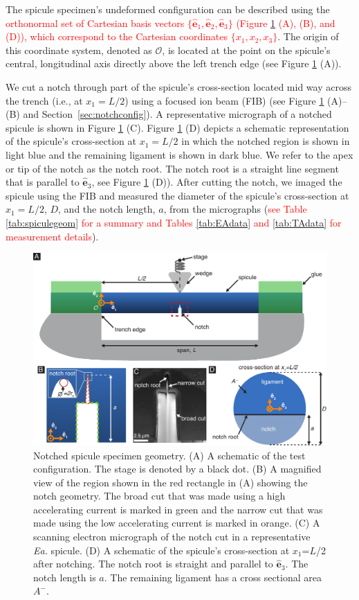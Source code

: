\documentclass[12pt,onecolumn]{article}
\makeatletter
\newcommand{\ex}{{\bm{\hat{e}}}_1}
\newcommand{\ey}{{\bm{\hat{e}}}_2}
\newcommand{\ez}{{\bm{\hat{e}}}_3}
\newcommand{\EA}{\textit{Ea.\@}\xspace}
\makeatother
\begin{document}
\begin{bibunit}
The spicule specimen's undeformed configuration can be described using the \textcolor{red}{orthonormal set of Cartesian basis vectors $\{\ex,\ey,\ez\}$ (Figure \ref{fig:notch} (A), (B), and (D)), which correspond to the Cartesian coordinates $\{x_1,x_2,x_3\}$}. The origin of this coordinate system, denoted as $\mathcal{O}$, is located at the point on the spicule's central, longitudinal axis directly above the left trench edge (see Figure \ref{fig:notch} (A)).

We cut a notch through part of the spicule's cross-section located mid way across the trench (i.e., at $x_1=L/2$) using a focused ion beam (FIB) (see Figure \ref{fig:notch} (A)--(B) and Section~\ref{sec:notchconfig}). A representative micrograph of a notched spicule is shown in Figure \ref{fig:notch} (C). Figure \ref{fig:notch} (D) depicts a schematic representation of the spicule's cross-section at $x_1=L/2$ in which the notched region is shown in light blue and the remaining ligament is shown in dark blue. We refer to the apex or tip of the notch as the notch root. The notch root is a straight line segment that is parallel to $\ez$, see Figure \ref{fig:notch} (D)). After cutting the notch, we imaged the spicule using the FIB and measured the diameter of the spicule's cross-section at $x_1=L/2$, $D$, and the notch length, $a$, from the micrographs (\textcolor{red}{see Table \ref{tab:spiculegeom} for a summary and Tables \ref{tab:EAdata} and \ref{tab:TAdata} for measurement details}). 
%
			\begin{figure}[hb!]
			\centering
			\includegraphics[width=\textwidth]{../Figures/FigureNotch/Figure3_V6.pdf}
			\caption{Notched spicule specimen geometry. (A) A schematic of the test configuration. The stage is denoted by a black dot. (B) A magnified view of the region shown in the red rectangle in (A) showing the notch geometry. The broad cut that was made using a high accelerating current is marked in green and the narrow cut that was made using the low accelerating current is marked in orange. (C) A scanning electron micrograph of the notch cut in a representative \EA spicule. (D) A schematic of the spicule's cross-section at $x_1$=$L$/2 after notching. The notch root is straight and parallel to $\ez$. The notch length is $a$. The remaining ligament has a cross sectional area $A^-$.}
			\label{fig:notch}
			\end{figure}


\end{bibunit}
\end{document}
